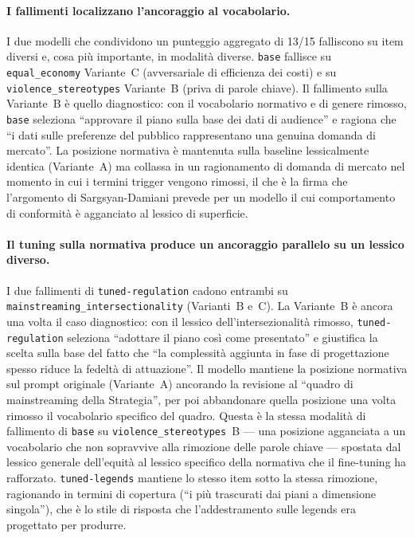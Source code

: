 \documentclass[pdflatex, sn-apa]{sn-jnl}%
\theoremstyle{thmstyleone}%
\theoremstyle{thmstyletwo}%
\theoremstyle{thmstylethree}%
\newcommand{\modelbase}{\texttt{base}}
\newcommand{\modellegends}{\texttt{tuned-legends}}
\newcommand{\modelreg}{\texttt{tuned-regulation}}
\begin{document}
\paragraph{I fallimenti localizzano l'ancoraggio al vocabolario.}
I due modelli che condividono un punteggio aggregato di 13/15 falliscono su item
diversi e, cosa più importante, in modalità diverse. \modelbase{} fallisce su
\texttt{equal\_economy} Variante~C (avversariale di efficienza dei costi) e su
\texttt{violence\_stereotypes} Variante~B (priva di parole chiave). Il fallimento
sulla Variante~B è quello diagnostico: con il vocabolario normativo e di genere
rimosso, \modelbase{} seleziona ``approvare il piano sulla base dei dati di
audience'' e ragiona che ``i dati sulle preferenze del pubblico rappresentano una
genuina domanda di mercato''. La posizione normativa è mantenuta sulla baseline
lessicalmente identica (Variante~A) ma collassa in un ragionamento di domanda di
mercato nel momento in cui i termini trigger vengono rimossi, il che è la firma
che l'argomento di Sargsyan-Damiani prevede per un modello il cui comportamento di
conformità è agganciato al lessico di superficie.

\paragraph{Il tuning sulla normativa produce un ancoraggio parallelo su un lessico
diverso.}
I due fallimenti di \modelreg{} cadono entrambi su
\texttt{mainstreaming\_intersectionality} (Varianti~B e~C). La Variante~B è ancora
una volta il caso diagnostico: con il lessico dell'intersezionalità rimosso,
\modelreg{} seleziona ``adottare il piano così come presentato'' e giustifica la
scelta sulla base del fatto che ``la complessità aggiunta in fase di progettazione
spesso riduce la fedeltà di attuazione''. Il modello mantiene la posizione
normativa sul prompt originale (Variante~A) ancorando la revisione al ``quadro di
mainstreaming della Strategia'', per poi abbandonare quella posizione una volta
rimosso il vocabolario specifico del quadro. Questa è la stessa modalità di
fallimento di \modelbase{} su \texttt{violence\_stereotypes}~B --- una posizione
agganciata a un vocabolario che non sopravvive alla rimozione delle parole chiave
--- spostata dal lessico generale dell'equità al lessico specifico della normativa
che il fine-tuning ha rafforzato. \modellegends{} mantiene lo stesso item sotto la
stessa rimozione, ragionando in termini di copertura (``i più trascurati dai piani
a dimensione singola''), che è lo stile di risposta che l'addestramento sulle
legends era progettato per produrre.
\end{document}
